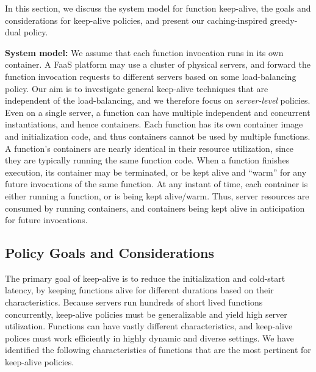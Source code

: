 
In this section, we discuss the system model for function keep-alive, the goals and considerations for keep-alive policies, and present our caching-inspired greedy-dual policy. 

\noindent \textbf{System model:} 
We assume that each function invocation runs in its own container. 
%
A FaaS platform may use a cluster of physical servers, and forward the function invocation requests to different servers based on some load-balancing policy. 
Our aim is to investigate general keep-alive techniques that are independent of the load-balancing, and we therefore focus on \emph{server-level} policies. 
Even on a single server, a function can have multiple independent and concurrent instantiations, and hence containers.
Each function has its own container image and initialization code, and thus containers cannot be used by multiple functions. 
A function's containers are nearly identical in their resource utilization, since they are typically running the same function code.
When a function finishes execution, its container may be terminated, or be kept alive and ``warm'' for any future invocations of the same function. 
%
At any instant of time, each container is either running a function, or is being kept alive/warm. %
%
Thus, server resources are consumed by running containers, and containers being kept alive in anticipation for future invocations. 




\vspace*{\subsecspace}
\subsection{Policy Goals and Considerations}
\vspace*{\subsecspace}

The primary goal of keep-alive is to reduce the initialization and cold-start latency, by keeping functions alive for different durations based on their characteristics. 
Because servers run hundreds of short lived functions concurrently, keep-alive policies must be generalizable and yield high server utilization. 
%
Functions can have vastly different characteristics, and keep-alive polices must work efficiently in highly dynamic and diverse settings. %
We have identified the following characteristics of functions that are the most pertinent for keep-alive policies.


